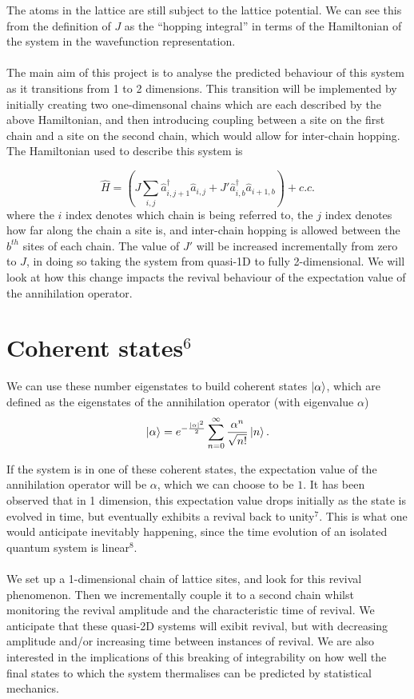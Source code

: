 \documentclass[a4paper,10pt]{article}
\begin{document}
The atoms in the lattice are still subject to the lattice potential. We can see this from the definition of $J$ as the ``hopping integral'' in terms of the Hamiltonian of
the system in the wavefunction representation.
\\\\
 The main aim of this project is to analyse the predicted behaviour of this system as it transitions from 1 to 2 dimensions. This transition will be implemented by initially 
 creating two one-dimensonal chains which are each described by the above Hamiltonian, and then introducing coupling between a site on the first chain and a site on the second
 chain, which would allow for inter-chain hopping. The Hamiltonian used to describe this system is
 
\begin{equation}
\hat{H}=(J\sum_{i,j}\hat{a}^\dagger_{i,j+1}\hat{a}_{i,j} + J'\hat{a}^\dagger_{i,b}\hat{a}_{i+1,b})+c.c.
\end{equation}
where the $i$ index denotes which chain is being referred to, the $j$ index denotes how far along the chain a site is, and inter-chain hopping is allowed between the $b^{th}$ 
sites of each chain. The value of $J'$ will be increased incrementally from zero to $J$, in doing so taking the system from quasi-1D to fully 2-dimensional. We will look at how
this change impacts the revival behaviour of the expectation value of the annihilation operator.

\section{Coherent states$^6$}

We can use these number eigenstates to build coherent states $\ket{\alpha}$, which are defined as the eigenstates of the annihilation operator (with eigenvalue $\alpha$)
\begin{equation}
\ket{\alpha}=e^{-\frac{|\alpha|^2}{2}} \sum_{n=0}^{\infty} \frac{\alpha^n}{\sqrt{n!}}\ket{n}.  
\end{equation}

If the system is in one of these coherent states, the expectation value of the annihilation operator will be $\alpha$, which we can choose to be $1$. %
It has been observed that in 1 dimension, this expectation value drops initially as the state is evolved in time, but eventually exhibits a revival back to unity$^7$. 
This is what one would anticipate inevitably happening, since the time evolution of an isolated quantum system is linear$^8$.
\\\\
We set up a 1-dimensional chain of lattice sites, and look for this revival phenomenon. Then we incrementally couple it to a second chain whilst monitoring the revival amplitude and the characteristic time 
of revival. We anticipate that these quasi-2D systems will exibit revival, but with decreasing amplitude and/or increasing time between instances of revival. We are also interested in the implications of this 
breaking of integrability on how well the final states to which the system thermalises can be predicted by statistical mechanics. 
\end{document}
